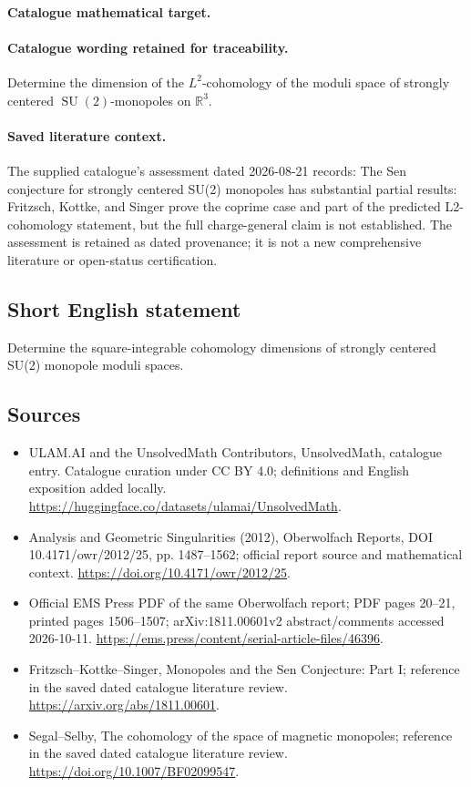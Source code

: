 \documentclass[11pt]{article}
\begin{document}
\paragraph{Catalogue mathematical target.}
\paragraph{Catalogue wording retained for traceability.}
Determine the dimension of the $L^2$-cohomology of the moduli space of strongly centered $\operatorname{SU}(2)$-monopoles on $\mathbb R^3$.

\paragraph{Saved literature context.} The supplied catalogue's assessment dated 2026-08-21 records: The Sen conjecture for strongly centered SU(2) monopoles has substantial partial results: Fritzsch, Kottke, and Singer prove the coprime case and part of the predicted L2-cohomology statement, but the full charge-general claim is not established. The assessment is retained as dated provenance; it is not a new comprehensive literature or open-status certification.
\subsection{Short English statement}
Determine the square-integrable cohomology dimensions of strongly centered SU(2) monopole moduli spaces.
\subsection{Sources}
\begin{itemize}
\item[\hypertarget{source:statement:1}{S1}] ULAM.AI and the UnsolvedMath Contributors, UnsolvedMath, catalogue entry. Catalogue curation under CC BY 4.0; definitions and English exposition added locally.
\url{https://huggingface.co/datasets/ulamai/UnsolvedMath}.
\item[\hypertarget{source:statement:2}{S2}] Analysis and Geometric Singularities (2012), Oberwolfach Reports, DOI 10.4171/owr/2012/25, pp. 1487--1562; official report source and mathematical context.
\url{https://doi.org/10.4171/owr/2012/25}.
\item[\hypertarget{source:statement:3}{S3}] Official EMS Press PDF of the same Oberwolfach report; PDF pages 20--21, printed pages 1506--1507; arXiv:1811.00601v2 abstract/comments accessed 2026-10-11.
\url{https://ems.press/content/serial-article-files/46396}.
\item[\hypertarget{source:statement:4}{S4}] Fritzsch--Kottke--Singer, Monopoles and the Sen Conjecture: Part I; reference in the saved dated catalogue literature review.
\url{https://arxiv.org/abs/1811.00601}.
\item[\hypertarget{source:statement:5}{S5}] Segal--Selby, The cohomology of the space of magnetic monopoles; reference in the saved dated catalogue literature review.
\url{https://doi.org/10.1007/BF02099547}.
\end{itemize}
\label{end:statement}
\end{document}
